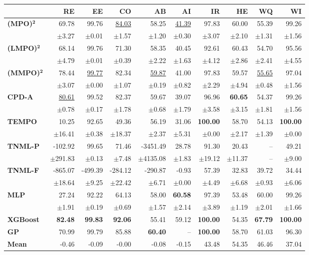 \begin{table}[!htbp]
\centering
\scriptsize
\begin{tabular}{lrrrrr||rrrr}
\toprule
 & RE & EE & CO & AB & AI & IR & HE & WQ & WI \\
\midrule
\textbf{(MPO)}$\bm{^2}$ & 69.78 & 99.76 & \underline{84.03} & 58.25 & \underline{41.39} & 97.83 & 60.00 & 55.39 & 99.26 \\
 & $\pm$3.27 & $\pm$0.01 & $\pm$1.57 & $\pm$1.20 & $\pm$0.30 & $\pm$3.07 & $\pm$2.10 & $\pm$1.31 & $\pm$1.56 \\
\midrule
\textbf{(LMPO)}$\bm{^2}$ & 68.14 & 99.76 & 71.30 & 58.35 & 40.45 & 92.61 & 60.43 & 54.70 & 95.56 \\
 & $\pm$4.79 & $\pm$0.01 & $\pm$0.39 & $\pm$2.22 & $\pm$1.63 & $\pm$4.12 & $\pm$2.86 & $\pm$2.41 & $\pm$4.55 \\
\midrule
\textbf{(MMPO)}$\bm{^2}$ & 78.44 & \underline{99.77} & 82.34 & \underline{59.87} & 41.00 & 97.83 & 59.57 & \underline{55.65} & 97.04 \\
 & $\pm$3.07 & $\pm$0.00 & $\pm$1.07 & $\pm$0.19 & $\pm$0.82 & $\pm$2.29 & $\pm$4.94 & $\pm$0.48 & $\pm$1.56 \\
\midrule
\textbf{CPD-A} & \underline{80.61} & 99.52 & 82.37 & 59.67 & 39.07 & 96.96 & \textbf{60.65} & 54.37 & 99.26 \\
 & $\pm$0.78 & $\pm$0.17 & $\pm$1.78 & $\pm$0.68 & $\pm$1.79 & $\pm$3.58 & $\pm$3.15 & $\pm$1.81 & $\pm$1.56 \\
\midrule
\textbf{TEMPO} & 10.25 & 92.65 & 49.36 & 56.19 & 31.06 & \textbf{100.00} & 58.70 & 54.13 & \textbf{100.00} \\
 & $\pm$16.41 & $\pm$0.38 & $\pm$18.37 & $\pm$2.37 & $\pm$5.31 & $\pm$0.00 & $\pm$2.17 & $\pm$1.39 & $\pm$0.00 \\
\midrule
\textbf{TNML-P} & -102.92 & 99.65 & 71.46 & -3451.49 & 28.78 & 91.30 & 20.43 & -- & 49.21 \\
 & $\pm$291.83 & $\pm$0.13 & $\pm$7.48 & $\pm$4135.08 & $\pm$1.83 & $\pm$19.12 & $\pm$11.37 & -- & $\pm$9.00 \\
\midrule
\textbf{TNML-F} & -865.07 & -499.39 & -284.12 & -290.87 & -0.93 & 57.39 & 32.83 & 39.72 & 34.44 \\
 & $\pm$18.64 & $\pm$9.25 & $\pm$22.42 & $\pm$6.71 & $\pm$0.00 & $\pm$4.49 & $\pm$6.68 & $\pm$0.93 & $\pm$6.06 \\
\midrule
\textbf{MLP} & 27.24 & 92.22 & 64.13 & 58.00 & \textbf{60.58} & 97.39 & 53.48 & 60.00 & 99.26 \\
 & $\pm$1.91 & $\pm$0.19 & $\pm$0.69 & $\pm$1.57 & $\pm$2.14 & $\pm$3.89 & $\pm$1.19 & $\pm$2.01 & $\pm$1.66 \\
\midrule
\textbf{XGBoost} & \textbf{82.48} & \textbf{99.83} & \textbf{92.06} & 55.41 & 59.12 & \textbf{100.00} & 54.35 & \textbf{67.79} & \textbf{100.00} \\
\midrule
\textbf{GP} & 70.99 & 99.79 & 85.88 & \textbf{60.40} & -- & \textbf{100.00} & 58.70 & 61.03 & 96.30 \\
\midrule
\textbf{Mean} & -0.46 & -0.09 & -0.00 & -0.08 & -0.15 & 43.48 & 54.35 & 46.46 & 37.04 \\
\bottomrule
\end{tabular}
\end{table}